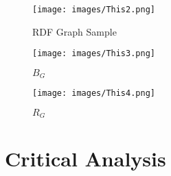 \documentclass[article,submit,pdftex,moreauthors]{Definitions/mdpi}
\begin{document}
\begin{figure}[H]
    \centering
    \texttt{[image: images/This2.png]}
    \caption{RDF Graph Sample}
    \label{fig:summaryExamples1}
\end{figure}

\begin{figure}[H]
    \centering
    \texttt{[image: images/This3.png]}
    \caption{$B_G$}
    \label{fig:summaryExamples2}
\end{figure}

\begin{figure}[H]
    \centering
    \texttt{[image: images/This4.png]}
    \caption{$R_G$}
    \label{fig:summaryExamples3}
\end{figure}

\section{Critical Analysis}
\end{document}
